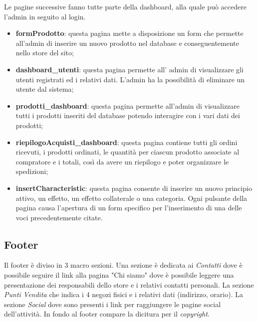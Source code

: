     Le pagine successive fanno tutte parte della dashboard, alla quale  può accedere l'admin in seguito al login.
\begin{itemize}
    \item \textbf{formProdotto}: questa pagina mette a disposizione un form che permette all'admin di inserire un nuovo prodotto nel database e conseguentemente nello store del sito;
    \item \textbf{dashboard\_utenti}: questa pagina permette all' admin di visualizzare gli utenti registrati ed i relativi dati. L'admin ha la possibilità di eliminare un utente dal sistema;
    \item \textbf{prodotti\_dashboard}: questa pagina permette all'admin di visualizzare tutti i prodotti inseriti del database potendo interagire con i vari dati dei prodotti;
    \item \textbf{riepilogoAcquisti\_dashboard}: questa pagina contiene tutti gli ordini ricevuti, i prodotti ordinati, le quantità per ciascun prodotto associate al compratore e i totali, così da avere un riepilogo e poter organizzare le spedizioni;
    \item \textbf{insertCharacteristic}: questa pagina consente di inserire un nuovo principio attivo, un effetto, un effetto collaterale o una categoria. Ogni pulsante della pagina causa l'apertura di un form specifico per l'inserimento di una delle voci precedentemente citate.
\end{itemize}
\subsection{Footer}
Il footer è diviso in 3 macro sezioni. Una sezione è dedicata ai \textit{Contatti} dove è possibile seguire il link alla pagina "Chi siamo" dove è possibile leggere una presentazione dei responsabili dello store e i relativi contatti personali. \newline
La sezione \textit{Punti Vendita} che indica i 4 negozi fisici e i relativi dati (indirizzo, orario).
La sezione \textit{Social} dove sono presenti i link per raggiungere le pagine social dell'attività.
In fondo al footer compare la dicitura per il \textit{copyright}.
